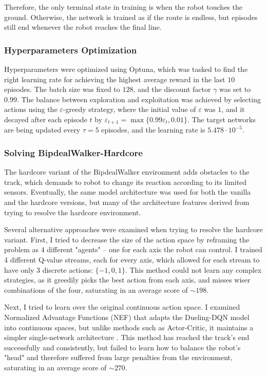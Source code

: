 \documentclass{article}
\begin{document}
\begin{multicols}{2}
Therefore, the only terminal state in training is when the robot touches the ground. Otherwise, the network is trained as if the route is endless, but episodes still end whenever the robot reaches the final line.

\subsubsection{Hyperparameters Optimization}
Hyperparameters were optimized using Optuna, which was tasked to find the right learning rate for achieving the highest average reward in the last $10$ episodes. The batch size was fixed to $128$, and the discount factor $\gamma$ was set to $0.99$.
The balance between exploration and exploitation was achieved by selecting actions using the $\varepsilon$-greedy strategy, where the initial value of $\varepsilon$ was $1$, and it decayed after each episode $t$ by $\varepsilon_{t+1} = \max\{0.99\varepsilon_t, 0.01\}$. The target networks are being updated every $\tau = 5$ episodes, and the learning rate is $5.478 \cdot 10^{-5}$.

\subsubsection{Solving BipdealWalker-Hardcore}
The hardcore variant of the BipdealWalker environment adds obstacles to the track, which demands to robot to change its reaction according to its limited sensors. Eventually, the same model architecture was used for both the vanilla and the hardcore versions, but many of the architecture features derived from trying to resolve the hardcore environment.

Several alternative approaches were examined when trying to resolve the hardcore variant. 
First, I tried to decrease the size of the action space by reframing the problem as 4 different "agents" -- one for each axis the robot can control. I trained 4 different Q-value streams, each for every axis, which allowed for each stream to have only 3 discrete actions: $\{-1, 0, 1\}$. This method could not learn any complex strategies, as it greedily picks the best action from each axis, and misses wiser combinations of the four, saturating in an average score of $\sim 198$.

Next, I tried to learn over the original continuous action space. I examined Normalized Advantage Functions (NEF) that adapts the Dueling-DQN model into continuous spaces, but unlike methods such as Actor-Critic, it maintains a simpler single-network architecture \cite{NEF}. 
This method has reached the track's end successfully and consistently, but failed to learn how to balance the robot's "head" and therefore suffered from large penalties from the environment, saturating in an average score of $\sim 270$.


\end{multicols}
\end{document}
